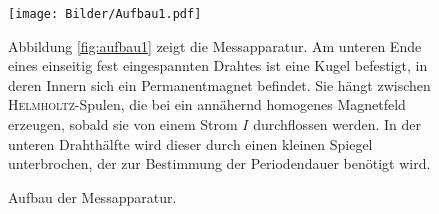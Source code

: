 \begin{figure}
\begin{minipage}[l]{0.49\textwidth}
	\centering
	\texttt{[image: Bilder/Aufbau1.pdf]}
	\caption{Aufbau der Messapparatur. \cite{V102}}
	\label{fig:aufbau1}
\end{minipage}
\begin{minipage}[r]{0.49\textwidth}
	
Abbildung \ref{fig:aufbau1} zeigt die Messapparatur. 
Am unteren Ende eines einseitig fest eingespannten Drahtes ist eine Kugel befestigt, in deren Innern sich ein Permanentmagnet befindet. 
Sie hängt zwischen \textsc{Helmholtz}-Spulen, die bei ein annähernd homogenes Magnetfeld erzeugen, sobald sie von einem Strom $I$ durchflossen werden.
In der unteren Drahthälfte wird dieser durch einen kleinen Spiegel unterbrochen, der zur Bestimmung der Periodendauer benötigt wird.
\label{sec:durchfuehrung2}
\end{minipage}
\end{figure}